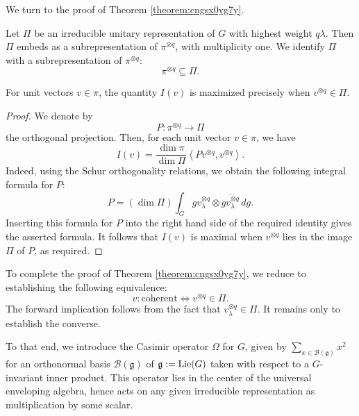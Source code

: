 \documentclass[reqno]{amsart} 
\begin{document}
We turn to the proof of Theorem \ref{theorem:cngsx0yg7y}.

Let $\Pi$ be an irreducible unitary representation of $G$ with highest weight $q \lambda$.  Then $\Pi$ embeds as a subrepresentation of $\pi^{\otimes q}$, with multiplicity one.  We identify $\Pi$ with a subrepresentation of $\pi^{\otimes q}$:
\begin{equation*}
  \pi^{\otimes q} \subseteq \Pi. 
\end{equation*}
\begin{lemma}\label{lemma:cngurf0apf}
  For unit vectors $v \in \pi$, the quantity $I(v)$ is maximized precisely when $v^{\otimes q} \in \Pi$.
\end{lemma}
\begin{proof}
  We denote by
  \begin{equation*}
    P : \pi^{\otimes q} \rightarrow \Pi
  \end{equation*}
  the orthogonal projection.  Then, for each unit vector $v \in \pi$, we have
  \begin{equation*}
    I(v) = \frac{\dim \pi}{\dim \Pi}
    \left\langle P v^{\otimes q}, v^{\otimes q} \right\rangle.
  \end{equation*}
  Indeed, using the Schur orthogonality relations, we obtain the following integral formula for $P$:
  \begin{equation*}
    P =(\dim \Pi) \int_{G} g v_\lambda^{\otimes q}
    \otimes \overline{g v_\lambda^{\otimes q}} \, d g. 
  \end{equation*}
  Inserting this formula for $P$ into the right hand side of the required identity gives the asserted formula.  It follows that $I(v)$ is maximal when $v^{\otimes q}$ lies in the image $\Pi$ of $P$, as required.
\end{proof}

To complete the proof of Theorem \ref{theorem:cngsx0yg7y}, we reduce to establishing the following equivalence:
\begin{equation}\label{eq:cngsx4hl1k}
  v:\text{coherent} \iff v^{\otimes q} \in \Pi.
\end{equation}
The forward implication follows from the fact that $v_{\lambda}^{\otimes q} \in \Pi$.  It remains only to establish the converse.

To that end, we introduce the Casimir operator $\Omega$ for $G$, given by $\sum_{x \in \mathcal{B}(\mathfrak{g})} x^2$ for an orthonormal basis $\mathcal{B}(\mathfrak{g})$ of $\mathfrak{g} := \operatorname{Lie}(G)$ taken with respect to a $G$-invariant inner product.  This operator lies in the center of the universal enveloping algebra, hence acts on any given irreducible representation as multiplication by some scalar.
\end{document}
